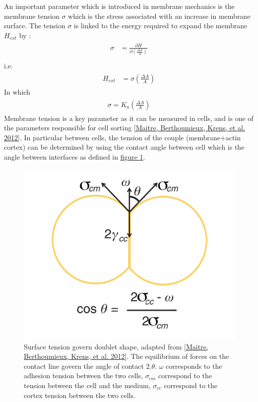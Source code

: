 \documentclass[A4paperpaper,11pt,english]{sphinxmanual}
\begin{document}
An important parameter which is introduced in membrane mechanics is the  membrane tension
\(\sigma\) which is the stress associated with an increase in membrane surface.
The tension \(\sigma\) is linked to the energy required to expand the membrane \(H_{ext}\) by :
\label{index-latex:equation-eqa4}\begin{gather}
\begin{split}\sigma &= \frac {\partial H} {\partial \left(\frac{\Delta A}{A}\right)} \\\end{split}\label{index-latex-eqa4}
\end{gather}
i.e.
\label{index-latex:equation-eqa5}\begin{gather}
\begin{split}H_{ext} &= \sigma\left( \frac {\Delta A} A \right)\end{split}\label{index-latex-eqa5}
\end{gather}
In which
\label{index-latex:equation-eqa6a}\begin{gather}
\begin{split}\sigma =  K_a \left( \frac {\Delta A} A \right)\end{split}\label{index-latex-eqa6a}
\end{gather}
Membrane tension is a key parameter as it can be measured in cells, and is one
of the parameters responsible for cell sorting {\hyperref[index-latex:maitre2012]{{[}Maitre, Berthoumieux, Krens,  et al.  2012{]}}}. In particular
between cells, the tension of the couple (membrane+actin cortex) can be
determined by using the contact angle between cell which is the angle between
interfaces as defined in \hyperref[index-latex:fig-tension-cell]{figure  \ref*{index-latex:fig-tension-cell}}.
\begin{figure}[htbp]
\centering
\capstart

\includegraphics[width=0.400\linewidth]{Cell-Surface-tension.png}
\caption{Surface tension govern doublet shape,  adapted from {\hyperref[index-latex:maitre2012]{{[}Maitre, Berthoumieux, Krens,  et al.  2012{]}}}.
The equilibrium of forces on the contact line govern the angle of contact
\(2.\theta\). \(\omega\) corresponds to the adhesion tension between
the two cells, \(\sigma_{cm}\) correspond to the tension between
the cell and the medium, \(\sigma_{cc}\) correspond to the cortex
tension between the two cells.}\label{index-latex:fig-tension-cell}\end{figure}
\end{document}
